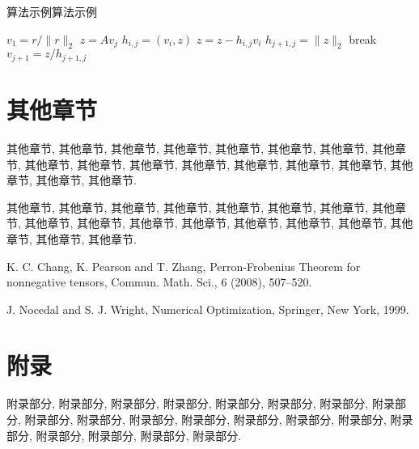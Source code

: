 \documentclass[UTF8,openright]{ctexbook}
\begin{document}
\begin{algorithm}[H]
\caption{算法示例算法示例\label{Alg:}}
  \begin{algorithmic}[1]
  \State $v_1 = r/\|r\|_2$
  \State $z = A v_j$
  \State $h_{i,j} = (v_i,z)$  
  \State $z = z - h_{i,j}v_i$
  \EndFor
  \State $h_{j+1,j}=\|z\|_2$
  \State break
  \EndIf
  \State $v_{j+1}=z/h_{j+1,j}$
  \EndFor
  \end{algorithmic}
\end{algorithm}

\clearpage{\pagestyle{empty}\cleardoublepage}
\chapter{其他章节}
其他章节, 其他章节, 其他章节, 其他章节, 其他章节, 其他章节,
其他章节, 其他章节, 其他章节, 其他章节, 其他章节, 其他章节,
其他章节, 其他章节, 其他章节, 其他章节, 其他章节, 其他章节.

其他章节, 其他章节, 其他章节, 其他章节, 其他章节, 其他章节,
其他章节, 其他章节, 其他章节, 其他章节, 其他章节, 其他章节,
其他章节, 其他章节, 其他章节, 其他章节, 其他章节, 其他章节.


\clearpage{\pagestyle{empty}\cleardoublepage}
\backmatter
\linespread{1.1}\selectfont
\setlength{\bibsep}{1ex}  %
\begin{thebibliography}{99}
\thispagestyle{plain}


  K. C. Chang, K. Pearson and T. Zhang,
  Perron-Frobenius Theorem for nonnegative tensors,
  Commun. Math. Sci., 6 (2008), 507--520.

  J. Nocedal and S. J. Wright,
  Numerical Optimization,
  Springer, New York, 1999.

\end{thebibliography}

\clearpage{\pagestyle{empty}\cleardoublepage}
\linespread{1.4}\selectfont
\chapter*{附录}

附录部分, 附录部分, 附录部分, 附录部分, 附录部分,
附录部分, 附录部分, 附录部分, 附录部分, 附录部分,
附录部分, 附录部分, 附录部分, 附录部分, 附录部分,
附录部分, 附录部分, 附录部分, 附录部分, 附录部分.
\end{document}
